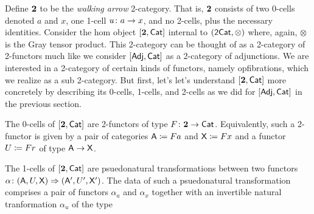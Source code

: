 \documentclass{amsart}
\begin{document}
Define $ \mathbf{2} $ to be the \emph{walking arrow}
2-category. That is, $ \mathbf{2} $ consists of two 0-cells
denoted $ a $ and $ x $, one 1-cell $ u \colon a \to x $, and
no 2-cells, plus the necessary identities.  Consider the hom
object $ [ \mathbf{2} , \mathsf{Cat} ] $ internal to
$ ( \mathsf{2Cat} , \otimes ) $ where, again, $ \otimes $ is the
Gray tensor product. This 2-category can be thought of as a
2-category of 2-functors much like we consider
$ [\mathsf{Adj}, \mathsf{Cat}] $ as a 2-category of adjunctions. We are
interested in a 2-category of certain kinds of functors,
namely opfibrations, which we realize as a sub
2-category. But first, let's let's understand
$ [ \mathbf{2},\mathsf{Cat} ] $ more concretely by describing its 0-cells,
1-cells, and 2-cells as we did for $ [\mathsf{Adj}, \mathsf{Cat}] $ in the
previous section.

The 0-cells of $ [\mathbf{2},\mathsf{Cat}] $ are 2-functors of type
$ F \colon \mathbf{2} \to \mathsf{Cat} $. Equivalently, such a 2-functor is
given by a pair of categories $ \mathsf{A} \coloneqq Fa $ and $ \mathsf{X}
\coloneqq Fx $ and a functor $ U \coloneqq Fr $ of type $ \mathsf{A} \to
\mathsf{X} $.

The 1-cells of $ [ \mathbf{2}, \mathsf{Cat}] $ are psuedonatural
transformations between two functors
$ \alpha \colon (\mathsf{A},U,\mathsf{X}) \Rightarrow ( \mathsf{A}',U',\mathsf{X}' ) $. The data of
such a psuedonatural transformation comprises a pair of
functors $ \alpha_a $ and $ \alpha_x $ together with an
invertible natural tranformation $ \alpha_u $ of the type
\begin{center}
\end{center}
\end{document}
